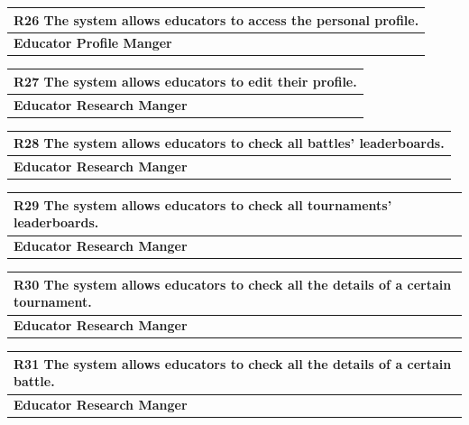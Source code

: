 \documentclass[12pt, a4paper]{report}
\begin{document}
\begin{table}[H]
    \begin{tabularx}{\textwidth}{X}
    \textbf{R26} The system allows educators to access the personal profile.\\
    \hline 
    \textbf{Educator Profile Manger}
\end{tabularx}
\end{table}

\begin{table}[H]
    \begin{tabularx}{\textwidth}{X}
    \textbf{R27} The system allows educators to edit their profile.\\
    \hline 
    \textbf{Educator Research Manger}
    \end{tabularx}
\end{table}

\begin{table}[H]
    \begin{tabularx}{\textwidth}{X}
    \textbf{R28} The system allows educators to check all battles' leaderboards.\\
    \hline 
    \textbf{Educator Research Manger}
    \end{tabularx}
\end{table}

\begin{table}[H]
    \begin{tabularx}{\textwidth}{X}
    \textbf{R29} The system allows educators to check all tournaments' leaderboards.\\
    \hline 
    \textbf{Educator Research Manger}
    \end{tabularx}
\end{table}

\begin{table}[H]
    \begin{tabularx}{\textwidth}{X}
    \textbf{R30} The system allows educators to check all the details of a certain tournament.\\
    \hline 
    \textbf{Educator Research Manger}
    \end{tabularx}
\end{table}

\begin{table}[H]
    \begin{tabularx}{\textwidth}{X}
    \textbf{R31} The system allows educators to check all the details of a certain battle.\\
    \hline 
    \textbf{Educator Research Manger}
    \end{tabularx}
\end{table}
\end{document}
